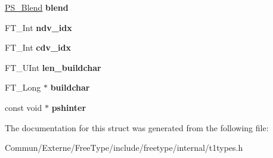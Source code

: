 \begin{DoxyCompactItemize}
\item 
\hyperlink{struct_p_s___blend_rec__}{P\+S\+\_\+\+Blend} {\bfseries blend}\hypertarget{struct_t1___face_rec___a51e4e76f9988ec601d1fec6b5d4611db}{}\label{struct_t1___face_rec___a51e4e76f9988ec601d1fec6b5d4611db}

\item 
F\+T\+\_\+\+Int {\bfseries ndv\+\_\+idx}\hypertarget{struct_t1___face_rec___a0ecadea7618642ccc351f81ac56ec266}{}\label{struct_t1___face_rec___a0ecadea7618642ccc351f81ac56ec266}

\item 
F\+T\+\_\+\+Int {\bfseries cdv\+\_\+idx}\hypertarget{struct_t1___face_rec___a7a77dcddf65ac6d86f1f62b3859d11d8}{}\label{struct_t1___face_rec___a7a77dcddf65ac6d86f1f62b3859d11d8}

\item 
F\+T\+\_\+\+U\+Int {\bfseries len\+\_\+buildchar}\hypertarget{struct_t1___face_rec___a75554021d0baddb1c64f69fd8dbde86b}{}\label{struct_t1___face_rec___a75554021d0baddb1c64f69fd8dbde86b}

\item 
F\+T\+\_\+\+Long $\ast$ {\bfseries buildchar}\hypertarget{struct_t1___face_rec___af1fd890acaa0f423f7cc36807c42d75f}{}\label{struct_t1___face_rec___af1fd890acaa0f423f7cc36807c42d75f}

\item 
const void $\ast$ {\bfseries pshinter}\hypertarget{struct_t1___face_rec___a438e8ce8cbd53b7e205b17f95e7b2106}{}\label{struct_t1___face_rec___a438e8ce8cbd53b7e205b17f95e7b2106}

\end{DoxyCompactItemize}


The documentation for this struct was generated from the following file\+:\begin{DoxyCompactItemize}
\item 
Commun/\+Externe/\+Free\+Type/include/freetype/internal/t1types.\+h\end{DoxyCompactItemize}
